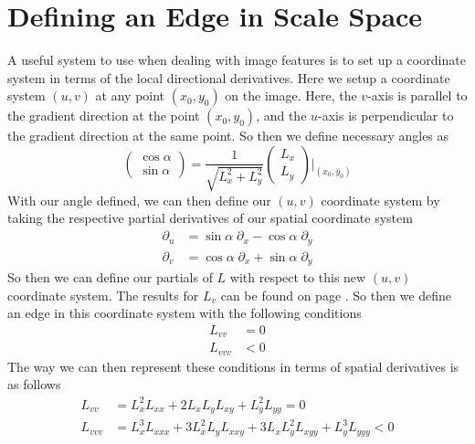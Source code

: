 \documentclass{article}
\begin{document}
\section{Defining an Edge in Scale Space}
A useful system to use when dealing with image features is to set up a coordinate system in terms of the local directional derivatives.
Here we setup a coordinate system $(u,v)$ at any point $(x_0,y_0)$ on the image.
Here, the $v$-axis is parallel to the gradient direction at the point $(x_0, y_0)$, and the $u$-axis is perpendicular to the gradient direction at the same point. So then we define necessary angles as \cite{Lindeberg1998}
\begin{equation}
  \begin{pmatrix}
    \cos{\alpha} \\
    \sin{\alpha}
  \end{pmatrix}
  = \frac{1}{\sqrt{L_x^2+L_y^2}}
  \begin{pmatrix}
    L_x \\
    L_y
  \end{pmatrix}
  \Bigg|_{(x_0,y_0)}
\end{equation}
With our angle defined, we can then define our $(u,v)$ coordinate system by taking the respective partial derivatives of our spatial coordinate system
\begin{align}
  \partial_u &= \sin{\alpha}\; \partial_x - \cos{\alpha}\; \partial_y \\
  \partial_v &= \cos{\alpha}\; \partial_x + \sin{\alpha}\; \partial_y
\end{align}
So then we can define our partials of $L$ with respect to this new $(u,v)$ coordinate system. The results for $L_v$ can be found on page \pageref{t_v}. So then we define an edge in this coordinate system with the following conditions \cite{Lindeberg1998}
\begin{equation} \label{eq:c1}
  \begin{aligned}
    L_{vv} &= 0 \\
    L_{vvv} &< 0
  \end{aligned}
\end{equation}
The way we can then represent these conditions in terms of spatial derivatives is as follows \cite{Lindeberg1998}
\begin{equation}
  \begin{aligned}
    L_{vv} &= L_x^2L_{xx}+2L_xL_yL_{xy}+L_y^2L_{yy} = 0 \\
    L_{vvv} &= L_x^3L_{xxx} +3L_x^2L_yL_{xxy}+3L_xL_y^2L_{xyy}+L_y^3L_{yyy} < 0
  \end{aligned}
\end{equation}
\end{document}
